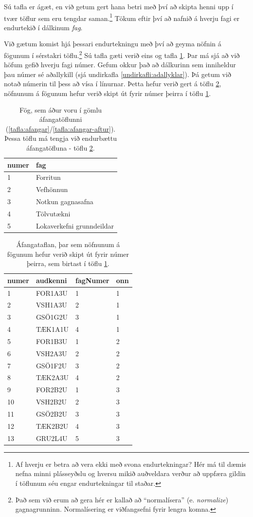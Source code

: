 Sú tafla er ágæt, en við getum gert hana betri með því að skipta henni upp í tvær töflur sem eru tengdar saman.\footnote{Af hverju er betra að vera ekki með svona endurtekningar? Hér má til dæmis nefna minni plásseyðslu og hversu mikið auðveldara verður að uppfæra gildin í töflunum séu engar endurtekningar til staðar.} Tökum eftir því að nafnið á hverju fagi er endurtekið í dálkinum \emph{fag}. 

Við gætum komist hjá þessari endurtekningu með því að geyma nöfnin á fögunum í sérstakri töflu.\footnote{Það sem við erum að gera hér er kallað að ``normalísera'' (e. \emph{normalize}) gagnagrunninn. Normalísering er viðfangsefni fyrir lengra komna.} Sú tafla gæti verið eins og tafla \ref{tafla:fog}.
Þar má sjá að við höfum gefið hverju fagi númer. Gefum okkur það að dálkurinn sem inniheldur þau númer sé aðallykill (sjá undirkafla \ref{undirkafli:adallyklar}). Þá getum við notað númerin til þess að vísa í línurnar. Þetta hefur verið gert á töflu \ref{tafla:afangar-fagnumer}, nöfnunum á fögunum hefur verið skipt út fyrir númer þeirra í töflu \ref{tafla:fog}.

\begin{table}
\centering
\caption[Fög]{Fög, sem áður voru í gömlu áfangatöflunni (\ref{tafla:afangar}/\ref{tafla:afangar-aftur}). Þessa töflu má tengja við endurbættu áfangatöfluna - töflu \ref{tafla:afangar-fagnumer}.}
\label{tafla:fog}
\begin{tabular}{ll}
\toprule
numer&fag\\
\midrule
1&Forritun\\
2&Vefhönnun\\
3&Notkun gagnasafna\\
4&Tölvutækni\\
5&Lokaverkefni grunndeildar\\
\bottomrule
\end{tabular}
\end{table}

\begin{table}
\centering
\caption[Áfangar - endurbætt]{Áfangataflan, þar sem nöfnunum á fögunum hefur verið skipt út fyrir númer þeirra, sem birtast í töflu \ref{tafla:fog}.}
\label{tafla:afangar-fagnumer}
\begin{tabular}{llll}
\toprule
numer&audkenni&fagNumer&onn\\
\midrule
1&	FOR1A3U&	1&	1\\
2&	VSH1A3U&	2&	1\\
3&	GSÖ1G2U&	3&	1\\
4&	TÆK1A1U&	4&	1\\
5&	FOR1B3U&	1&	2\\
6&	VSH2A3U&	2&	2\\
7&	GSÖ1F2U&	3&	2\\
8&	TÆK2A3U&	4&	2\\
9&	FOR2B2U&	1&	3\\
10&	VSH2B2U&	2&	3\\
11&	GSÖ2B2U&	3&	3\\
12&	TÆK2B2U&	4&	3\\
13&	GRU2L4U&	5&	3\\
\bottomrule
\end{tabular}
\end{table}

